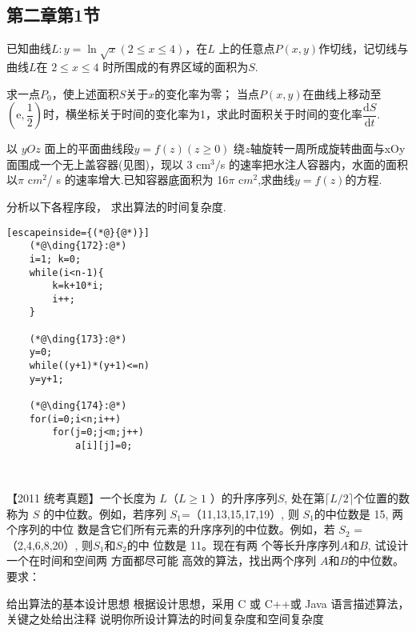 \subsection{第二章第1节}
\begin{qitems}[tr]
    
    \begin{bbox}
        \qitem  已知曲线$L:y=\ln\sqrt{x}(2\leqslant x\leqslant4)$，在$L$ 上的任意点$P(x,y)$作切线，记切线与曲线$L$在 $2\leqslant x\leqslant4$
        时所围成的有界区域的面积为$S$.
        \begin{subqitems}
            \subqitem 求一点$P_0$，使上述面积$S$关于$x$的变化率为零；
            \subqitem 当点$P(x,y)$在曲线上移动至$(\mathrm{e},\dfrac{1}{2})$时，横坐标关于时间的变化率为1，求此时面积关于时间的变化率$\dfrac{\mathrm{d}S}{\mathrm{d}t}.$
        \end{subqitems}

    \end{bbox}

    \begin{bbox}
        \qitem 以 $yOz$ 面上的平面曲线段$y=f(z)(z\geqslant0)$ 绕$z$轴旋转一周所成旋转曲面与xOy 面围成一个无上盖容器(见图)，现以 3 cm$^3/$s 的速率把水注人容器内，水面的面积以$\pi$ c$m^2$/ s 的速率增大.已知容器底面积为 16$\pi$ c$m^2$,求曲线$y=f(z)$的方程.

    \end{bbox}

    \begin{bbox}
        \qitem   分析以下各程序段， 求出算法的时间复杂度.
        \begin{lstlisting}[escapeinside={(*@}{@*)}]
    (*@\ding{172}:@*)
    i=1; k=0;
    while(i<n-1){
        k=k+10*i;
        i++;
    }

    (*@\ding{173}:@*)
    y=0;
    while((y+1)*(y+1)<=n)
    y=y+1;

    (*@\ding{174}:@*)
    for(i=0;i<n;i++)
        for(j=0;j<m;j++)
            a[i][j]=0;
    
        
        \end{lstlisting}
    \end{bbox}

    \begin{bbox}
        \qitem   【2011 统考真题】一个长度为 $L$（$L\geqslant 1$ ）的升序序列$ S$, 处在第$\lceil L/2\rceil $个位置的数称为 $S$
        的中位数。例如，若序列 $S_1$=（11,13,15,17,19）, 则 $S_1$的中位数是 15, 两 个序列的中位
        数是含它们所有元素的升序序列的中位数。例如，若 $S_2$ =（2,4,6,8,20）, 则$S_1$和$S_2$的中
        位数是 11。现在有两 个等长升序序列$A$和$B$, 试设计一个在时间和空间两 方面都尽可能
        高效的算法，找出两个序列 $A$和$B$的中位数。要求：
        \begin{subqitems}
            \subqitem 给出算法的基本设计思想
            \subqitem  根据设计思想，采用 C 或 C++或 Java 语言描述算法，关键之处给出注释
            \subqitem 说明你所设计算法的时间复杂度和空间复杂度
        \end{subqitems}
    \end{bbox}
\end{qitems}